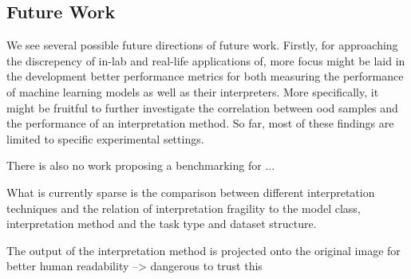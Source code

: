 

\subsection{Future Work}
We see several possible future directions of future work. 
Firstly, for approaching the discrepency of in-lab and real-life applications of, more focus might be laid in the development better performance metrics for both measuring the performance of machine learning models as well as their interpreters. 
More specifically, it might be fruitful to further investigate the correlation between ood samples and the performance of an interpretation method. So far, most of these findings are limited to specific experimental settings. 


There is also no work proposing a benchmarking for ... 

What is currently sparse is the comparison between different interpretation techniques and the relation of interpretation fragility to the model class, interpretation method and the task type and dataset structure. 


The output of the interpretation method is projected onto the original image for better human readability
--> dangerous to trust this




